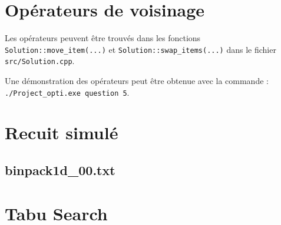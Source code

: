 \documentclass[10pt,a4paper]{article}
\begin{document}
\section{Opérateurs de voisinage}

Les opérateurs peuvent être trouvés dans les fonctions \texttt{Solution::move\_item(...)} et \texttt{Solution::swap\_items(...)} dans le fichier \texttt{src/Solution.cpp}.

Une démonstration des opérateurs peut être obtenue avec la commande : \texttt{./Project\_opti.exe question 5}.

\section{Recuit simulé}
\subsection{binpack1d\_00.txt}


\section{Tabu Search}


\fi
\end{document}

